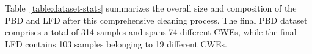 \documentclass[lettersize,journal]{IEEEtran}
\begin{document}
Table~\ref{table:dataset-stats} summarizes the overall size and composition of the \gls{PBD} and \gls{LFD} after this comprehensive cleaning process. The final \gls{PBD} dataset comprises a total of 314 samples and spans 74 different CWEs, while the final \gls{LFD} contains 103 samples belonging to 19 different CWEs.


\end{document}

